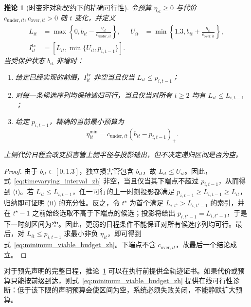 \documentclass[UTF8,11pt]{ctexart}
\newtheorem{corollary}{推论}
\begin{document}
\begin{corollary}[时变非对称契约下的精确可行性]
\label{cor:timevarying_zh}
令预算 $\eta_{it}\geq0$ 与代价 $c_{\mathrm{under},it},c_{\mathrm{over},it}>0$ 随 $t$ 变化，并定义
\begin{align}
  L_{it}&=\max\!\left\{0,b_{it}-\frac{\eta_{it}}{c_{\mathrm{under},it}}\right\},
  &
  U_{it}&=\min\!\left\{1.3,b_{it}+\frac{\eta_{it}}{c_{\mathrm{over},it}}\right\},
  \label{eq:timevarying_bounds_zh}\\
  I^{\mathrm{tv}}_{it}&=[L_{it},\min\{U_{it},p_{i,t-1}\}].
  \label{eq:timevarying_interval_zh}
\end{align}
当受保护状态 $b_{it}$ 非增时：
\begin{enumerate}[label=(\roman*),leftmargin=*]
  \item 给定已经实现的前缀，$I^{\mathrm{tv}}_{it}$ 非空当且仅当 $L_{it}\leq p_{i,t-1}$；
  \item 对每一条候选序列均保持递归可行，当且仅当对所有 $t\geq2$ 均有 $L_{it}\leq L_{i,t-1}$；
  \item 给定 $p_{i,t-1}$，精确的当前最小预算为
  \begin{equation}
    \eta^{\min}_{it}
    =c_{\mathrm{under},it}(b_{it}-p_{i,t-1})_{+}.
    \label{eq:minimum_viable_budget_zh}
  \end{equation}
\end{enumerate}
上侧代价日程会改变损害管上侧半径与投影输出，但不决定递归区间是否为空。
\end{corollary}
\begin{proof}
由于 $b_{it}\in[0,1.3]$，独立损害管包含 $b_{it}$，故 $L_{it}\leq U_{it}$。因此，式~\eqref{eq:timevarying_interval_zh} 非空，当且仅当其下端点不超过 $p_{i,t-1}$，从而得到 (i)。若 $L_{it}\leq L_{i,t-1}$，任一可行的上一时刻投影都满足 $p_{i,t-1}\geq L_{i,t-1}\geq L_{it}$，归纳即可证明 (ii) 的充分性。反之，令 $t^{\star}$ 为首个满足 $L_{i,t^{\star}}>L_{i,t^{\star}-1}$ 的索引，并在 $t^{\star}-1$ 之前始终选取不高于下端点的候选；投影将给出 $p_{i,t^{\star}-1}=L_{i,t^{\star}-1}$，于是下一时刻区间为空。因此，更弱的日程条件不能保证对所有候选序列均可行。最后，对 $L_{it}\leq p_{i,t-1}$ 求最小非负 $\eta_{it}$，即可得到式~\eqref{eq:minimum_viable_budget_zh}。下端点不含 $c_{\mathrm{over},it}$，故最后一个结论成立。
\end{proof}

对于预先声明的完整日程，推论~\ref{cor:timevarying_zh} 可以在执行前提供全轨迹证书。如果代价或预算只能按前缀到达，则式~\eqref{eq:minimum_viable_budget_zh} 提供在线可行性诊断：低于该下限的声明预算会使区间为空，系统必须失败关闭，不能静默扩大预算。
\end{document}
